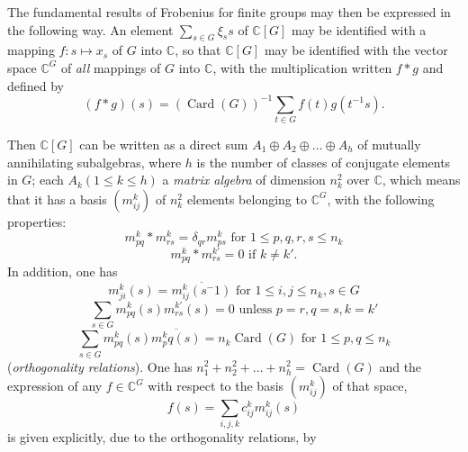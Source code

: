 \documentclass[12pt,a4paper,leqno,twoside]{extbook}
\newcommand{\C}{\mathbb{C}}
\newcommand{\Card}{\operatorname{Card}}
\begin{document}
The fundamental results of Frobenius for finite groups may then be expressed in the following way. An element \(\sum\limits_{s \in G} \xi_s s\) of \(\C[G]\) may be identified with a mapping \(f: s \mapsto x_s\) of \(G\) into \(\C\), so that \(\C[G]\) may be identified with the vector space \(\C^G\) of \emph{all} mappings of \(G\) into \(\C\), with the multiplication written \(f * g\) and defined by
\begin{equation}
    \label{eq:7.48}
    (f * g)(s) = (\Card(G))^{-1} \sum_{t \in G} f(t)g(t^{-1} s).
\end{equation}

Then \(\C[G]\) can be written as a direct sum \(A_1 \oplus A_2 \oplus \ldots \oplus A_h\) of mutually annihilating subalgebras, where \(h\) is the number of classes of conjugate elements in \(G\); each \(A_k (1 \leq k \leq h)\) a \emph{matrix algebra} of dimension \(n^2_k\) over \(\C\), which means that it has a basis \((m^k_{ij})\) of \(n^2_k\) elements belonging to \(\C^G\), with the following properties:
\begin{equation}
    \label{eq:7.49}
    m^k_{pq} * m^k_{rs} = \delta_{qr} m^k_{ps}
    \text{ for }
    1 \leq p, q, r, s \leq n_k
\end{equation}
\begin{equation}
    \label{eq:7.50}
    m^k_{pq} * m^{k'}_{rs} = 0
    \text{ if }
    k \neq k'.
\end{equation}
In addition, one has
\begin{equation}
    \label{eq:7.51}
    m^k_{ji}(s) = \overline{m^k_{ij}(s^-1)}
    \text{ for }
    1 \leq i, j \leq n_k, s \in G
\end{equation}
\begin{equation}
    \label{eq:7.52}
    \sum_{s \in G} m^k_{pq}(s) m^{k'}_{rs}(s) = 0
    \text{ unless }
    p=r, q=s, k=k'
\end{equation}
\begin{equation}
    \label{eq:7.53}
    \sum_{s \in G} m^k_{pq}(s) \overline{m^k_pq(s)} = n_k \Card(G)
    \text{ for }
    1 \leq p, q \leq n_k
\end{equation}
(\emph{orthogonality relations}). One has \(n^2_1 + n^2_2 + \ldots + n^2_h = \Card(G)\) and the expression of any \(f \in \C^G\) with respect to the basis \((m^k_{ij})\) of that space,
\begin{equation}
    \label{eq:7.54}
    f(s) = \sum_{i, j, k} c^k_{ij} m^k_{ij}(s)
\end{equation}
is given explicitly, due to the orthogonality relations, by
\end{document}
